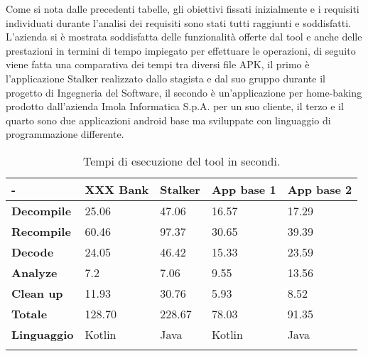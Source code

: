 Come si nota dalle precedenti tabelle, gli obiettivi fissati inizialmente e i requisiti individuati durante l'analisi dei requisiti sono stati tutti raggiunti e soddisfatti.\\
L'azienda si è mostrata soddisfatta delle funzionalità offerte dal tool e anche delle prestazioni in termini di tempo impiegato per effettuare le operazioni, di seguito viene fatta una comparativa dei tempi tra diversi file APK, il primo è l'applicazione Stalker realizzato dallo stagista e dal suo gruppo durante il progetto di Ingegneria del Software, il secondo è un'applicazione per home-baking prodotto dall'azienda Imola Informatica S.p.A. per un suo cliente, il terzo e il quarto sono due applicazioni android base ma sviluppate con linguaggio di programmazione differente.
\begin{longtable}{| C{2cm}| C{2cm}| C{2.5cm}| C{2.5cm}| C{2.5cm}|}
    \hline
    - & \textbf{XXX Bank} & \textbf{Stalker} & \textbf{App base 1} & \textbf{App base 2} \\\hline
    \textbf{Decompile}    & 25.06             & 47.06            & 16.57               & 17.29               \\\hline
    \textbf{Recompile}    & 60.46             & 97.37            & 30.65               & 39.39               \\\hline
    \textbf{Decode}       & 24.05             & 46.42            & 15.33               & 23.59               \\\hline
    \textbf{Analyze}      & 7.2               & 7.06             & 9.55                & 13.56               \\\hline
    \textbf{Clean up}     & 11.93             & 30.76            & 5.93                & 8.52                \\\hline
    \textbf{Totale}       & 128.70            & 228.67           & 78.03               & 91.35               \\\hline
    \textbf{Linguaggio}   & Kotlin            & Java             & Kotlin              & Java                \\\hline
    \caption{Tempi di esecuzione del tool in secondi.}
\end{longtable}

